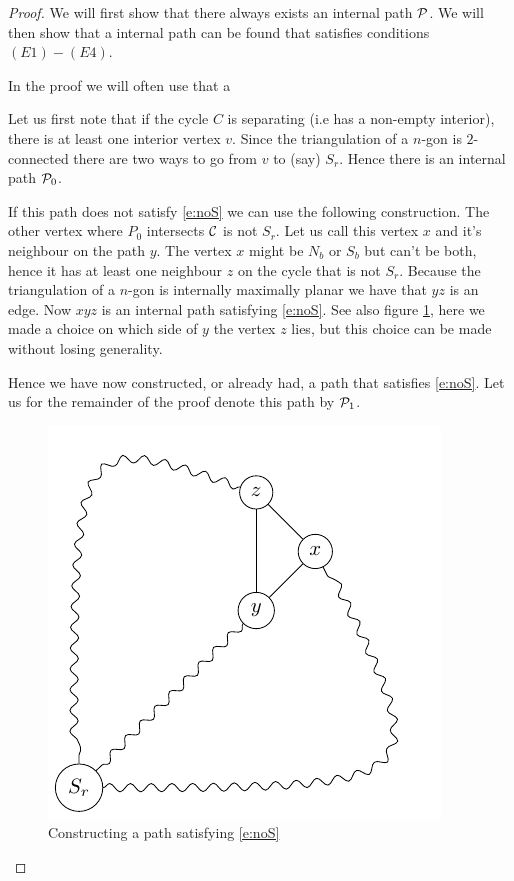 \begin{proof}
We will first show that there always exists an internal path $\P$. We will then show that a internal path can be found that satisfies conditions $(E1) - (E4)$.

In the proof we will often use that a

Let us first note that if the cycle $C$ is separating (i.e has a non-empty interior), there is at least one interior vertex $v$. Since the triangulation of a $n$-gon is $2$-connected there are two ways to go from $v$ to (say) $S_r$. Hence there is an internal path $\P_0$.

If this path does not satisfy \ref{e:noS} we can use the following construction. The other vertex where $P_0$ intersects $\C$ is not $S_r$. Let us call this vertex $x$ and it's neighbour on the path $y$. The vertex $x$ might be $N_b$ or $S_b$ but can't be both, hence it has at least one neighbour $z$ on the cycle that is not $S_r$. Because the triangulation of a $n$-gon is internally maximally planar we have that $yz$ is an edge. Now $xyz$ is an internal path satisfying \ref{e:noS}. See also figure \ref{fig:E1}, here we made a choice on which side of $y$ the vertex $z$ lies, but this choice can be made without losing generality.

Hence we have now constructed, or already had, a path that satisfies \ref{e:noS}. Let us for the remainder of the proof denote this path by $\P_1$.


\begin{figure}[ht]
\centering
\includegraphics[]{algo/img/E1}
\caption{Constructing a path satisfying \ref{e:noS} \label{fig:E1}}
\end{figure}


\end{proof}
